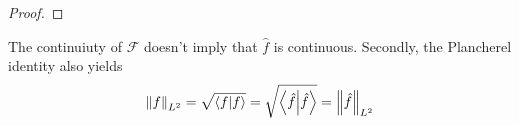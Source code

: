 \documentclass[../../script.tex]{subfiles}
\begin{document}
\begin{proof}
    \noproof
\end{proof}

\begin{rem}
    The continuiuty of $\mathcal{F}$ doesn't imply that $\hat{f}$ is continuous. Secondly, the Plancherel identity also yields 
    \[
        \norm{f}_{L^2} = \sqrt{\innerproduct{f}{f}} = \sqrt{\innerproduct{\hat{f}}{\hat{f}}} = \norm{\hat{f}}_{L^2}
    \]
\end{rem}
\end{document}
